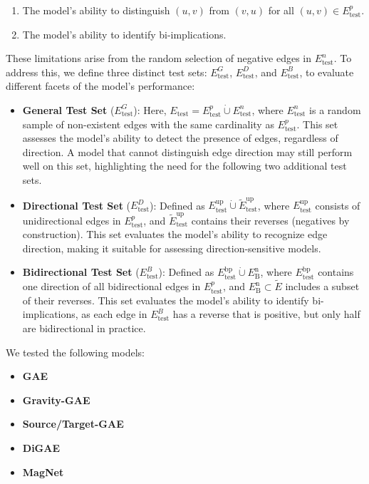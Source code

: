 \begin{enumerate}
    \item The model's ability to distinguish $(u,v)$ from $(v,u)$ for all $(u,v) \in E_{\text{test}}^p$.
    \item The model's ability to identify bi-implications.
\end{enumerate}

These limitations arise from the random selection of negative edges in $E_{\text{test}}^n$.
To address this, we define three distinct test sets: $E_{\text{test}}^G$, $E_{\text{test}}^D$,
and $E_{\text{test}}^B$, to evaluate different facets of the model’s performance:

\begin{itemize}
    \item \textbf{General Test Set} ($E_{\text{test}}^G$):
    Here, $E_{\text{test}} = E_{\text{test}}^p \dot{\cup} E_{\text{test}}^n$, where $E_{\text{test}}^n$
    is a random sample of non-existent edges with the same cardinality as $E_{\text{test}}^p$.
    This set assesses the model's ability to detect the presence of edges, regardless of direction.
    A model that cannot distinguish edge direction may still perform well on this set, highlighting
    the need for the following two additional test sets.
    \item \textbf{Directional Test Set} ($E_{\text{test}}^D$):
    Defined as $E_{\text{test}}^{\text{up}} \dot{\cup} \tilde{E}_{\text{test}}^{\text{up}}$,
    where $E_{\text{test}}^{\text{up}}$ consists of unidirectional edges in $E_{\text{test}}^p$,
    and $\tilde{E}_{\text{test}}^{\text{up}}$ contains their reverses (negatives by construction).
    This set evaluates the model's ability to recognize edge direction, making it suitable for
    assessing direction-sensitive models.
    \item \textbf{Bidirectional Test Set} ($E_{\text{test}}^B$):
    Defined as $E_{\text{test}}^{\text{bp}} \dot{\cup} E_{\text{B}}^{\text{n}}$,
    where $E_{\text{test}}^{\text{bp}}$ contains one direction of all bidirectional edges in $E_{\text{test}}^p$,
    and $E_{\text{B}}^{\text{n}} \subset \tilde{E}$ includes a subset of their reverses.
    This set evaluates the model's ability to identify bi-implications, as each edge in $E_{\text{test}}^B$
    has a reverse that is positive, but only half are bidirectional in practice.
\end{itemize}

We tested the following models:

\begin{itemize}
    \item \textbf{GAE}~\cite{Kipf2016}
    \item \textbf{Gravity-GAE}~\cite{Salha2019}
    \item \textbf{Source/Target-GAE}~\cite{Salha2019}
    \item \textbf{DiGAE}~\cite{Kollias2022}
    \item \textbf{MagNet}~\cite{Zhang2021}
\end{itemize}


